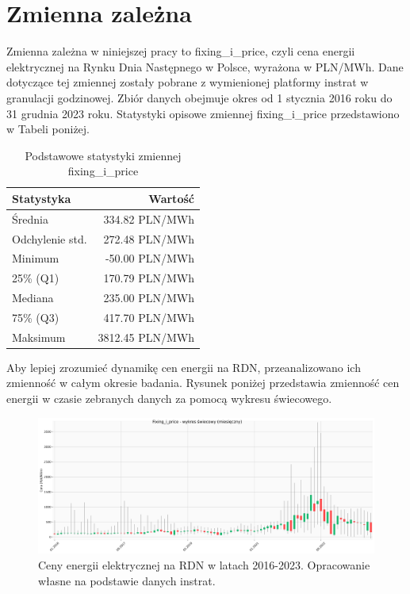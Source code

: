 \section{Zmienna zależna}
Zmienna zależna w niniejszej pracy to fixing\_i\_price, czyli cena energii elektrycznej na Rynku Dnia Następnego w Polsce, wyrażona w PLN/MWh. Dane dotyczące tej zmiennej zostały pobrane z wymienionej platformy instrat w granulacji godzinowej. Zbiór danych obejmuje okres od 1 stycznia 2016 roku do 31 grudnia 2023 roku. Statystyki opisowe zmiennej fixing\_i\_price przedstawiono w Tabeli poniżej. 
\begin{table}[H]
    \centering
    \begin{tabular}{|l|r|}
    \hline
    \textbf{Statystyka} & \textbf{Wartość} \\ \hline
    Średnia             & 334.82 PLN/MWh   \\ \hline
    Odchylenie std.     & 272.48 PLN/MWh   \\ \hline
    Minimum             & -50.00 PLN/MWh   \\ \hline
    25\% (Q1)           & 170.79 PLN/MWh   \\ \hline
    Mediana             & 235.00 PLN/MWh   \\ \hline
    75\% (Q3)           & 417.70 PLN/MWh   \\ \hline
    Maksimum            & 3812.45 PLN/MWh  \\ \hline
    \end{tabular}
    \caption{Podstawowe statystyki zmiennej fixing\_i\_price}
    \label{tab:fixing-i-price-stats}
\end{table}

Aby lepiej zrozumieć dynamikę cen energii na RDN, przeanalizowano ich zmienność w całym okresie badania. Rysunek poniżej przedstawia zmienność cen energii w czasie zebranych danych za pomocą wykresu świecowego.
\begin{figure}[H]
    \centering
    \includegraphics[width=\textwidth]{../plots/candlestick_fixing_i_price.png}
    \caption{Ceny energii elektrycznej na RDN w latach 2016-2023. Opracowanie własne na podstawie danych instrat.}
    \label{fig:fixing-i-price-trend}
\end{figure}

